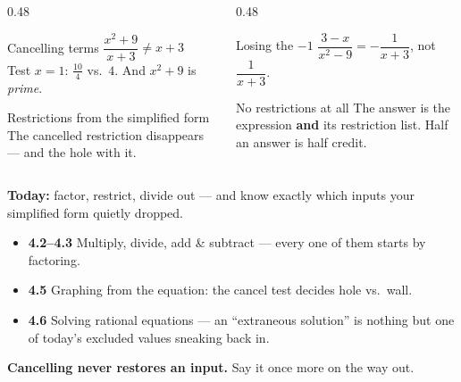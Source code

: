 \documentclass[aspectratio=169, 11pt]{beamer}
\begin{document}
\begin{frame}[t, plain]
  \begin{columns}[T]
    \begin{column}{0.48\textwidth}
      \begin{block}{Cancelling terms}
        $\dfrac{x^2+9}{x+3}\neq x+3$ \\[3pt]
        {\footnotesize Test $x=1$: $\tfrac{10}{4}$ vs.\ $4$. And $x^2+9$ is \emph{prime}.}
      \end{block}
      \vspace{3pt}
      \begin{block}{Restrictions from the simplified form}
        The cancelled restriction disappears --- and the hole with it.
      \end{block}
    \end{column}
    \begin{column}{0.48\textwidth}
      \begin{block}{Losing the $-1$}
        $\dfrac{3-x}{x^2-9}=-\dfrac{1}{x+3}$, not $\dfrac{1}{x+3}$.
      \end{block}
      \vspace{3pt}
      \begin{block}{No restrictions at all}
        The answer is the expression \textbf{and} its restriction list. Half an answer is half credit.
      \end{block}
    \end{column}
  \end{columns}
\end{frame}

\begin{frame}[t, plain]
  \textbf{Today:} factor, restrict, divide out --- and know exactly which inputs your simplified form
  quietly dropped.\\[8pt]
  \begin{itemize}\setlength{\itemsep}{3pt}
    \item \textbf{4.2--4.3} Multiply, divide, add \& subtract --- every one of them starts by factoring.
    \item \textbf{4.5} Graphing from the equation: the cancel test decides hole vs.\ wall.
    \item \textbf{4.6} Solving rational equations --- an ``extraneous solution'' is nothing but one of
          today's excluded values sneaking back in.
  \end{itemize}
  \vspace{6pt}
  \begin{center}
    \textbf{Cancelling never restores an input.} Say it once more on the way out.
  \end{center}
\end{frame}
\end{document}
